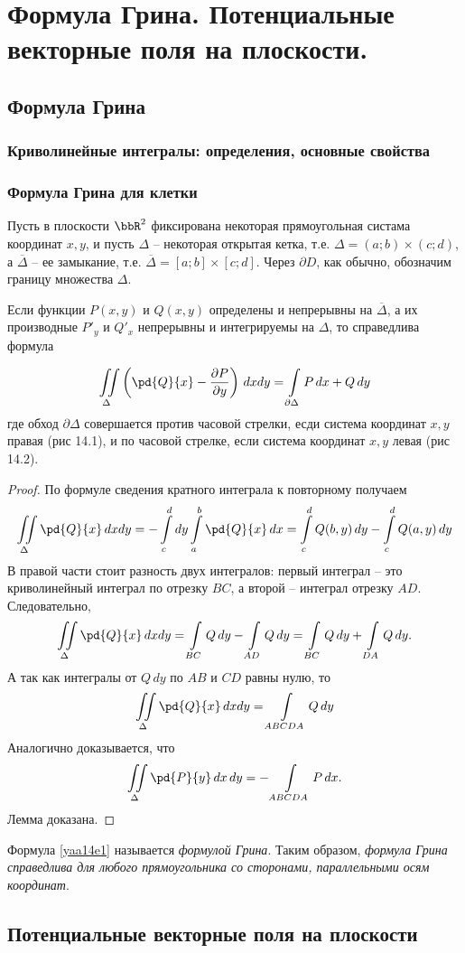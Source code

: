 \chapter{Формула Грина. Потенциальные векторные поля на плоскости.}
\section{Формула Грина} 

\subsection{Криволинейные интегралы: определения, основные свойства}

\subsection{Формула Грина для клетки}

Пусть в плоскости $\bbR^2$ фиксирована некоторая прямоугольная систама координат $x,y$, и пусть $\Delta$ -- некоторая открытая кетка, т.е. $\Delta = (a;b)\times(c;d)$, а $\overline{\Delta}$ -- ее замыкание, т.е. $\overline{\Delta}=[a;b]\times[c;d]$. Через $\partial D$, как обычно, обозначим границу множества $\Delta$.


\begin{lemm}
Если функции $P(x,y)$ и $Q(x,y)$ определены и непрерывны на $\overline{\Delta}$, а их производные $P'_y$ и $Q'_x$ непрерывны и интегрируемы на $\Delta$, то справедлива формула

\begin{equation} \label{yaa14e1}
\iint\limits_{\Delta} \left( \pd{Q}{x}-\frac{\partial P}{\partial y} \right)\,dxdy = \int\limits_{\partial \Delta} P\,dx + Q\,dy
\end{equation}
где обход $\partial\Delta$ совершается против часовой стрелки, есди система координат $x,y$ правая (рис 14.1), и по часовой стрелке, если система координат $x,y$ левая (рис 14.2).
\end{lemm}

\begin{proof}
По формуле сведения кратного интеграла к повторному получаем
$$
\iint\limits_{\Delta} \pd{Q}{x} \,dxdy = -\int_{c}^{d}\limits dy \int_a^b\limits \pd{Q}{x}\,dx = \int_c^d\limits Q(b,y)\,dy - \int_c^d\limits Q(a,y)\,dy
$$
В правой части стоит разность двух интегралов: первый интеграл -- это криволинейный интеграл по отрезку $BC$, а второй -- интеграл отрезку $AD$. Следовательно,
$$
\iint\limits_\Delta\pd{Q}{x}\,dxdy = \int_{BC}\limits Q\,dy - \int_{AD}\limits Q\,dy = \int_{BC}\limits Q\,dy + \int_{DA}\limits Q\,dy.
$$
А так как интегралы от $Q\,dy$ по $AB$ и $CD$ равны нулю, то
$$
\iint\limits_\Delta\pd{Q}{x}\,dxdy = \int\limits_{ABCDA} Q\,dy
$$
Аналогично доказывается, что
$$
\iint\limits_\Delta\pd{P}{y}\,dx\,dy = -\int\limits_{ABCDA} P\,dx.  
$$ 
\noindent
Лемма доказана.
\end{proof}
Формула \eqref{yaa14e1} называется \textit{формулой Грина}. Таким образом, \textit{формула Грина справедлива для любого прямоугольника со сторонами, параллельными осям координат}.

\begin{thm}

\end{thm}


\section{Потенциальные векторные поля на плоскости}